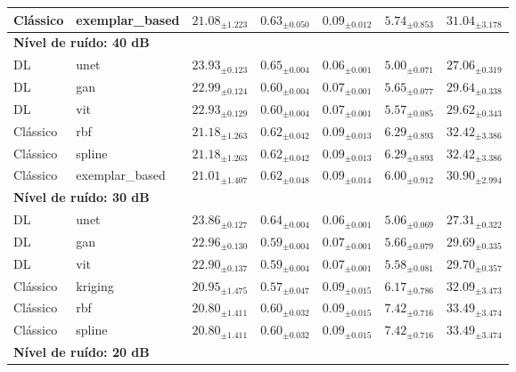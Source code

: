 \begin{table}[htbp]
{\begin{tabular}{llccccc}
Clássico & exemplar\_based & $21.08_{\pm 1.223}$ & $0.63_{\pm 0.050}$ & $0.09_{\pm 0.012}$ & $\mathbf{5.74_{\pm 0.853}}$ & $\mathbf{31.04_{\pm 3.178}}$ \\
\midrule
\multicolumn{7}{l}{\textbf{Nível de ruído: 40 dB}} \\
DL & unet & $\mathbf{23.93_{\pm 0.123}}$ & $\mathbf{0.65_{\pm 0.004}}$ & $\mathbf{0.06_{\pm 0.001}}$ & $\mathbf{5.00_{\pm 0.071}}$ & $\mathbf{27.06_{\pm 0.319}}$ \\
DL & gan & $22.99_{\pm 0.124}$ & $0.60_{\pm 0.004}$ & $0.07_{\pm 0.001}$ & $5.65_{\pm 0.077}$ & $29.64_{\pm 0.338}$ \\
DL & vit & $22.93_{\pm 0.129}$ & $0.60_{\pm 0.004}$ & $0.07_{\pm 0.001}$ & $5.57_{\pm 0.085}$ & $29.62_{\pm 0.343}$ \\
Clássico & rbf & $\mathbf{21.18_{\pm 1.263}}$ & $\mathbf{0.62_{\pm 0.042}}$ & $\mathbf{0.09_{\pm 0.013}}$ & $6.29_{\pm 0.893}$ & $32.42_{\pm 3.386}$ \\
Clássico & spline & $\mathbf{21.18_{\pm 1.263}}$ & $\mathbf{0.62_{\pm 0.042}}$ & $\mathbf{0.09_{\pm 0.013}}$ & $6.29_{\pm 0.893}$ & $32.42_{\pm 3.386}$ \\
Clássico & exemplar\_based & $21.01_{\pm 1.407}$ & $0.62_{\pm 0.048}$ & $0.09_{\pm 0.014}$ & $6.00_{\pm 0.912}$ & $\mathbf{30.90_{\pm 2.994}}$ \\
\midrule
\multicolumn{7}{l}{\textbf{Nível de ruído: 30 dB}} \\
DL & unet & $\mathbf{23.86_{\pm 0.127}}$ & $\mathbf{0.64_{\pm 0.004}}$ & $\mathbf{0.06_{\pm 0.001}}$ & $\mathbf{5.06_{\pm 0.069}}$ & $\mathbf{27.31_{\pm 0.322}}$ \\
DL & gan & $22.96_{\pm 0.130}$ & $0.59_{\pm 0.004}$ & $0.07_{\pm 0.001}$ & $5.66_{\pm 0.079}$ & $29.69_{\pm 0.335}$ \\
DL & vit & $22.90_{\pm 0.137}$ & $0.59_{\pm 0.004}$ & $0.07_{\pm 0.001}$ & $5.58_{\pm 0.081}$ & $29.70_{\pm 0.357}$ \\
Clássico & kriging & $\mathbf{20.95_{\pm 1.475}}$ & $0.57_{\pm 0.047}$ & $\mathbf{0.09_{\pm 0.015}}$ & $6.17_{\pm 0.786}$ & $32.09_{\pm 3.473}$ \\
Clássico & rbf & $20.80_{\pm 1.411}$ & $0.60_{\pm 0.032}$ & $0.09_{\pm 0.015}$ & $7.42_{\pm 0.716}$ & $33.49_{\pm 3.474}$ \\
Clássico & spline & $20.80_{\pm 1.411}$ & $0.60_{\pm 0.032}$ & $0.09_{\pm 0.015}$ & $7.42_{\pm 0.716}$ & $33.49_{\pm 3.474}$ \\
\midrule
\multicolumn{7}{l}{\textbf{Nível de ruído: 20 dB}} \\

\end{tabular}}
\end{table}
